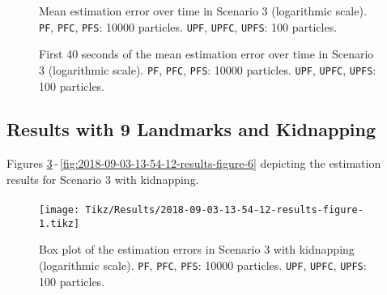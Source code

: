 \begin{figure}
	\centering
	\setlength{} 	
	\setlength\figurewidth{0.9\textheight}		
	\caption[Mean estimation error over time in Scenario 3. \texttt{PF}, \texttt{PFC}, \texttt{PFS}: 10000 particles. \texttt{UPF}, \texttt{UPFC}, \texttt{UPFS}: 100 particles.]{Mean estimation error over time in Scenario 3 (logarithmic scale). \texttt{PF}, \texttt{PFC}, \texttt{PFS}: 10000 particles. \texttt{UPF}, \texttt{UPFC}, \texttt{UPFS}: 100 particles.}
	\label{fig:2018-08-30-19-17-11-results-figure-4}			
\end{figure}

\begin{figure}
	\centering
	\setlength{} 	
	\setlength\figurewidth{0.9\textheight}		
	\caption[First 40 seconds of the mean estimation error over time in Scenario 3. \texttt{PF}, \texttt{PFC}, \texttt{PFS}: 10000 particles. \texttt{UPF}, \texttt{UPFC}, \texttt{UPFS}: 100 particles.]{First 40 seconds of the mean estimation error over time in Scenario 3 (logarithmic scale). \texttt{PF}, \texttt{PFC}, \texttt{PFS}: 10000 particles. \texttt{UPF}, \texttt{UPFC}, \texttt{UPFS}: 100 particles.}
	\label{fig:2018-08-30-19-17-11-results-figure-6}			
\end{figure}


\subsection{Results with 9 Landmarks and Kidnapping}

Figures \ref{fig:2018-09-03-13-54-12-results-figure-1}\,-\,\ref{fig:2018-09-03-13-54-12-results-figure-6} depicting the estimation results for Scenario 3 with kidnapping.

\paragraph{}



\begin{figure}[h!]
	\centering
	\setlength\figureheight{0.8\textheight} 	
	\setlength{}		
	\texttt{[image: Tikz/Results/2018-09-03-13-54-12-results-figure-1.tikz]}			
	\caption[Box plot of the estimation errors in Scenario 3 with kidnapping. \texttt{PF}, \texttt{PFC}, \texttt{PFS}: 10000 particles. \texttt{UPF}, \texttt{UPFC}, \texttt{UPFS}: 100 particles.]
	{Box plot of the estimation errors in Scenario 3 with kidnapping (logarithmic scale). \texttt{PF}, \texttt{PFC}, \texttt{PFS}: 10000 particles. \texttt{UPF}, \texttt{UPFC}, \texttt{UPFS}: 100 particles.}
	\label{fig:2018-09-03-13-54-12-results-figure-1}			
\end{figure}

